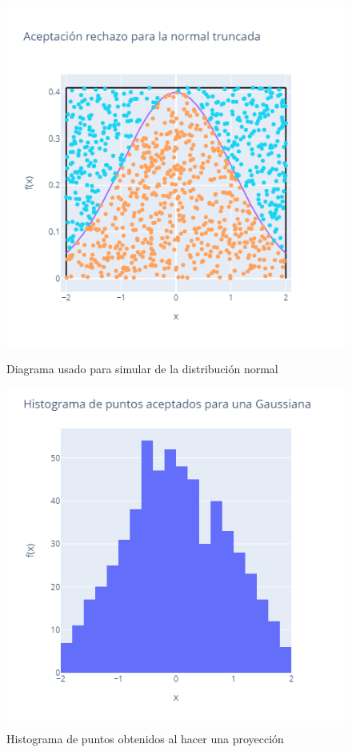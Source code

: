 \documentclass[10pt]{article}
\begin{document}
\begin{figure}[H]
    \centering
    \begin{minipage}[b]{0.45\textwidth}  %
        \includegraphics[scale=.3]{ar.png}
        \caption{Diagrama usado para simular de la distribución normal}
        \label{fig:ar}
    
    \end{minipage}
    \hfill  %
    \begin{minipage}[b]{0.45\textwidth}  %
        \includegraphics[scale=.3]{hist.png}
        \caption{Histograma de puntos obtenidos al hacer una proyección}
        \label{fig:hist}
  
    \end{minipage}
\end{figure}
\end{document}
